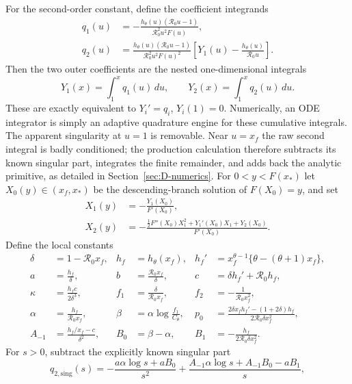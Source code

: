 \documentclass[11pt,a4paper]{article}
\newcommand{\Rzero}{\mathcal R_0}
\newcommand{\xf}{x_f}
\newcommand{\xs}{x_*}
\begin{document}
For the second-order constant, define the coefficient integrands
\begin{align*}
 q_1(u)&=-\frac{h_\theta(u)(\Rzero u-1)}
 {\Rzero^2u^2F(u)},\\
 q_2(u)&=\frac{h_\theta(u)(\Rzero u-1)}
 {\Rzero^2u^2F(u)^2}
 \left[Y_1(u)-\frac{h_\theta(u)}{\Rzero u}\right].
\end{align*}
Then the two outer coefficients are the nested one-dimensional integrals
\begin{equation}
 \boxed{\qquad
 Y_1(x)=\int_1^x q_1(u)\,du,
 \qquad
 Y_2(x)=\int_1^x q_2(u)\,du.
 \qquad}
 \label{eq:exec-Y12}
\end{equation}
These are exactly equivalent to $Y_i'=q_i$, $Y_i(1)=0$.  Numerically, an ODE
integrator is simply an adaptive quadrature engine for these cumulative
integrals.  The apparent singularity at $u=1$ is removable.  Near $u=\xf$ the
raw second integral is badly conditioned; the production calculation therefore
subtracts its known singular part, integrates the finite remainder, and adds
back the analytic primitive, as detailed in Section~\ref{sec:D-numerics}.
For $0<y<F(\xs)$ let $X_0(y)\in(\xf,\xs)$ be the descending-branch solution
of $F(X_0)=y$, and set
\begin{align*}
 X_1(y)&=-\frac{Y_1(X_0)}{F'(X_0)},\\
 X_2(y)&=-\frac{\tfrac12F''(X_0)X_1^2+Y_1'(X_0)X_1+Y_2(X_0)}
 {F'(X_0)}.
\end{align*}
Define the local constants
\begin{align*}
 \delta&=1-\Rzero\xf,&h_f&=h_\theta(\xf),
 &h_f'&=\xf^{\theta-1}\{\theta-(\theta+1)\xf\},\\
 a&=\frac{h_f}{\delta},&b&=\frac{\Rzero\xf}{\delta},
 &c&=\delta h_f'+\Rzero h_f,\\
 \kappa&=\frac{h_fc}{2\delta^3},
 &f_1&=\frac{\delta}{\Rzero\xf},
 &f_2&=-\frac1{\Rzero\xf^2},\\
 \alpha&=\frac{h_f}{\Rzero\xf},
 &\beta&=\alpha\log\frac{f_1}{C_\theta},
 &p_0&=\frac{2\delta\xf h_f'-(1+2\delta)h_f}
 {2\Rzero\delta\xf^2},\\
 A_{-1}&=\frac{h_f/\xf-c}{\delta^2},
 &B_0&=\beta-\alpha,
 &B_1&=-\frac{h_f}{2\Rzero\delta\xf^2}.
\end{align*}
For $s>0$, subtract the explicitly known singular part
\begin{equation}
 q_{2,\mathrm{sing}}(s)
 =-\frac{a\alpha\log s+aB_0}{s^2}
 +\frac{A_{-1}\alpha\log s+A_{-1}B_0-aB_1}{s},
 \label{eq:exec-q2sing}
\end{equation}
\end{document}
